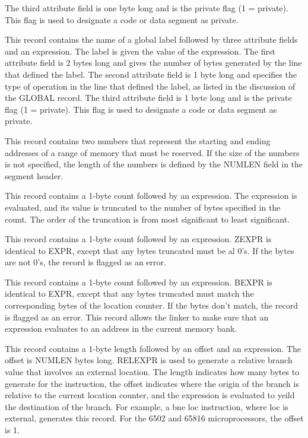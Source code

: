 \smallskip

\bodybody
The third attribute field is one byte long and is the private flag (1 =
private). This flag is used to designate a code or data segment as private.

 This record contains the name of a global label followed by
three attribute fields and an expression. The label is given the value of the
expression. The first attribute field is 2 bytes long and gives the number of
bytes generated by the line that defined the label. The second attribute
field is 1 byte long and specifies the type of operation in the line that
defined the label, as listed in the discussion of the {\omf GLOBAL} record.
The third attribute field is 1 byte long and is the private flag (1 =
private). This flag is used to designate a code or data segment as private.

 This record contains two numbers that represent the starting
and ending addresses of a range of memory that must be reserved. If the size
of the numbers is not specified, the length of the numbers is defined by the
{\omf NUMLEN} field in the segment header.

 This record contains a 1-byte count followed by an
expression. The expression is evaluated, and its value is truncated to the
number of bytes specified in the count. The order of the truncation is from
most significant to least significant.

 This record contains a 1-byte count followed by an
expression. {\omf ZEXPR} is identical to {\omf EXPR}, except that any bytes
truncated must be al 0's. If the bytes are not 0's, the record is flagged as
an error.

 This record contains a 1-byte count followed by an
expression. {\omf BEXPR} is identical to {\omf EXPR,} except that any bytes
truncated must match the corresponding bytes of the location counter. If the
bytes don't match, the record is flagged as an error. This record allows the
linker to make sure that an expression evaluates to an address in the current
memory bank.

 This record contains a 1-byte length followed by an
offset and an expression. The offset is {\omf NUMLEN} bytes long.
{\omf RELEXPR} is used to generate a relative branch value that involves an
external location. The length indicates how many bytes to generate for the
instruction, the offset indicates where the origin of the branch is relative
to the current location counter, and the expression is evaluated to yeild the
destination of the branch. For example, a {\text bne loc} instruction, where
{\text loc} is external, generates this record. For the 6502 and 65816
microprocessors, the offset is 1.

